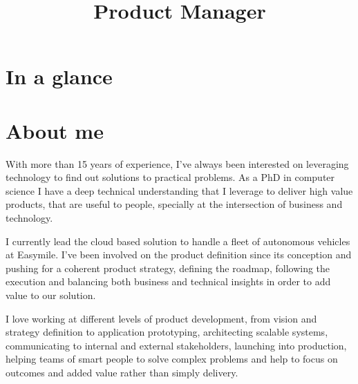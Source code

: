 \documentclass[10pt,a4paper,sans]{moderncv}
\title{Product Manager}
\begin{document}
\makecvtitle



\section{In a glance}



\section{About me}\closesection
With more than 15 years of experience, I've always been interested on leveraging technology to find out solutions to practical problems. As a PhD in computer science I have a deep technical understanding that I leverage to deliver high value products, that are useful to people, specially at the intersection of business and technology.

I currently lead the cloud based solution to handle a fleet of autonomous vehicles at Easymile. I’ve been involved on the product definition since its conception and pushing for a coherent product strategy, defining the roadmap, following the execution and balancing both business and technical insights in order to add value to our solution.

I love working at different levels of product development, from vision and strategy definition to application prototyping, architecting scalable systems, communicating to internal and external stakeholders, launching into production, helping teams of smart people to solve complex problems and help to focus on outcomes and added value rather than simply delivery.
\end{document}

